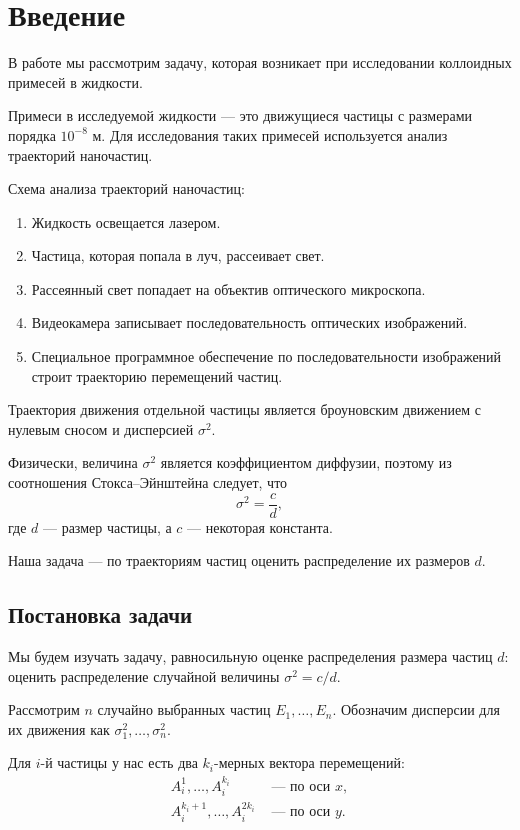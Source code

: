 \documentclass[../paper.tex]{subfiles}
\begin{document}
\section{Введение}
В работе мы рассмотрим задачу, которая возникает при исследовании коллоидных примесей в жидкости.

Примеси в исследуемой жидкости --- это движущиеся частицы с размерами порядка $10^{-8}$ м.
Для исследования таких примесей используется анализ траекторий наночастиц.

Схема анализа траекторий наночастиц:
\begin{enumerate}
	\item Жидкость освещается лазером.
	\item Частица, которая попала в луч, рассеивает свет.
	\item Рассеянный свет попадает на объектив оптического микроскопа.
	\item Видеокамера записывает последовательность оптических изображений.
	\item Специальное программное обеспечение по последовательности изображений строит траекторию перемещений частиц.
\end{enumerate}

Траектория движения отдельной частицы является броуновским движением с нулевым сносом и дисперсией $\sigma^2$.

Физически, величина $\sigma^2$ является коэффициентом диффузии, поэтому из соотношения Стокса--Эйнштейна следует, что
\[
	\sigma^2 = \frac{c}{d}
,\] где $d$ --- размер частицы, а $c$ --- некоторая константа.

Наша задача ---  по траекториям частиц оценить распределение их размеров $d$.

\subsection{Постановка задачи}
Мы будем изучать задачу, равносильную оценке распределения размера частиц $d$: оценить распределение случайной величины $\sigma^2 = c/d$.

Рассмотрим $n$ случайно выбранных частиц $E_1, \dots, E_n$. 
Обозначим дисперсии для их движения как $\sigma_1^2, \dots, \sigma_n^2$. 

Для $i$-й частицы у нас есть два $k_i$-мерных вектора перемещений: 
\begin{align*}
	A_i^1, \dots, A_i^{k_i} &\text{ --- по оси } x, \\
	A_i^{k_i+1}, \dots, A_i^{2k_i} &\text{ --- по оси } y
.\end{align*}
\end{document}
